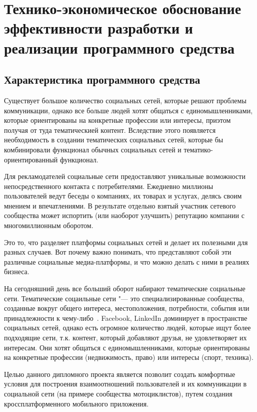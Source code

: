 


\section{Технико-экономическое обоснование эффективности разработки и реализации программного средства}
\label{sec:economics}

\subsection{Характеристика программного средства}
\label{sec:economics:description}

Существует большое количество социальных сетей, которые решают проблемы коммуникации, однако все больше людей хотят общаться с единомышленниками, которые ориентированы на конкретные профессии или интересы, приэтом получая от туда тематическией контент.
Вследствие этого появляется необходимость в создании тематических социальных сетей, которые бы комбинировали функционал обычных социальных сетей и тематико-ориентированный функционал.

Для рекламодателей социальные сети предоставляют уникальные
возможности непосредственного контакта с потребителями. Ежедневно
миллионы пользователей ведут беседы о компаниях, их товарах и услугах,
делясь своим мнением и впечатлениями. В результате отдельно взятый
участник сетевого сообщества может испортить (или наоборот улучшить)
репутацию компании с многомиллионным оборотом.

Это то, что разделяет платформы социальных сетей и делает их
полезными для разных случаев. Вот почему важно понимать, что
представляют собой эти различные социальные медиа-платформы, и что
можно делать с ними в реалиях бизнеса. 

На сегодняшний день все больший оборот набирают тематические социальные сети. Тематические соцаильные сети "--- это специализированные сообщества, созданные вокруг общего интереса, местоположения, потребности, события или принадлежности к чему-либо~\cite{verticalSN}. 
Facebook, LinkedIn доминирует в пространстве социальных сетей, однако есть огромное количество людей, которые ищут более подходящие сети, т.к. контент, который добавляют друзья, не удовлетворяет их интересам.
Они хотят общаться с единомышленниками, которые ориентированы на конкретные профессии (недвижимость, право) или интересы (спорт, техника). 

Целью данного дипломного проекта является позволит создать комфортные условия для построения взаимоотношений пользователей и их коммуникации в социальной сети (на примере сообщества мотоциклистов), 
путем создания кроссплатформенного мобильного приложения.

